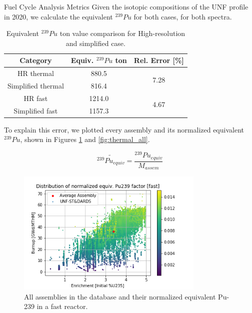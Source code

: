 \documentclass[final]{beamer}
\newlength{\onecolwid}
\newlength{\threecolwid}
\begin{document}
\begin{frame}[t]
\begin{columns}[t,totalwidth=\threecolwid]

\begin{column}{\onecolwid} %


\begin{block}{Fuel Cycle Analysis Metrics}
Given the isotopic compositions of the \gls{UNF} profile in 2020,
we calculate the equivalent $^{239}Pu$ for both cases, for
both spectra.

\begin{table}[h]
    \centering
    \begin{tabular}{ccc}
        \hline
        Category & Equiv. $^{239}Pu$ ton & Rel. Error [\%] \\
        \hline
        HR thermal & 880.5 & \multirow{2}{*}{7.28}\\
        Simplified thermal & 816.4\\
        \hline
        HR fast & 1214.0 & \multirow{2}{*}{4.67}\\
        Simplified fast & 1157.3 &\\
        \hline
    \end{tabular}
    \caption{Equivalent $^{239}Pu$ ton value comparison for High-resolution and simplified case.}
    \label{tab:equiv}
\end{table}


To explain this error, we plotted every assembly and its
normalized equivalent $^{239}Pu$, shown in Figures \ref{fig:fast_all} and \ref{fig:thermal_all}.

\[ \widetilde{^{239}Pu_{equiv}} = \frac{^{239}Pu_{equiv}}{M_{assem}}\]

\begin{figure}
    \centering
    \includegraphics[width=0.8\textwidth]{../images/fast_all.png}
    \caption{All assemblies in the database and their normalized equivalent Pu-239 in a fast reactor.}
    \label{fig:fast_all}
\end{figure}


\end{block}
\end{column}
\end{columns}
\end{frame}
\end{document}
